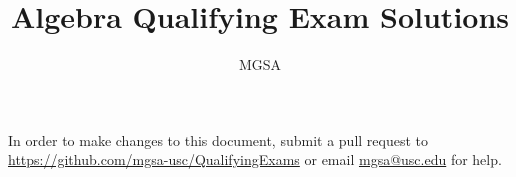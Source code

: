 \documentclass{article}
\begin{document}
\title{Algebra Qualifying Exam Solutions}
\author{MGSA}
\maketitle
In order to make changes to this document, submit a pull request to
\linebreak
\url{https://github.com/mgsa-usc/QualifyingExams}
or email \href{mailto:mgsa@usc.edu}{mgsa@usc.edu} for help.
\tableofcontents
\pagebreak

\pagebreak

\pagebreak

\pagebreak

\end{document}
